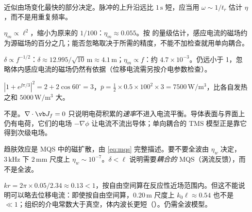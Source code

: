 \begin{answers}
\item 近似由场变化最快的部分决定。脉冲的上升沿远比 $1\,\mathrm s$ 短，应当用 $\omega\sim1/t_r$ 估计 $\eta$，而不是用重复频率。
\item $\eta_m\propto\ell^2$，缩小为原来的 $1/100$：$\eta_m\approx0.055$。按 的量级估计，感应电流的磁场约为源磁场的百分之几；能否忽略取决于所需的精度，不能不加检查就用单向耦合。
\item $\delta\propto f^{-1/2}$：$\delta\approx12.995/\sqrt{10}\,\mathrm m\approx4.1\,\mathrm m$；$\eta_m\propto f$：约 $4.7\times10^{-3}$。仍远小于 1，忽略体内感应电流的磁场仍然有依据（位移电流需另按介电参数检查）。
\item $|1+e^{\jj\pi/3}|^2=2+2\cos60^\circ=3$，$\overline p=\tfrac12\times0.5\times100^2\times3=7500\,\mathrm{W/m^3}$，比各自发热之和 $5000\,\mathrm{W/m^3}$ 大。
\item 不是。$\nabla\cdot\vb J_f=0$ 只说明电荷积累的\emph{速率}不进入电流平衡。导体表面与界面上仍有电荷，它们的电场 $-\nabla\phi$ 让电流不流出导体；单向耦合的 TMS 模型正是靠它得到次级电场。
\item 趋肤效应是 MQS 中的磁扩散，由 \eqref{eq:mqs} 完整描述。要不要全波由 $\eta_w$ 决定，$3\,\mathrm{kHz}$ 下 $2\,\mathrm{mm}$ 尺度上 $\eta_w\sim10^{-7}$。$\delta<\ell$ 说明需要\emph{耦合的} MQS（涡流反馈），而不是全波。
\item $kr=2\pi\times0.05/2.34\approx0.13<1$，按自由空间算在反应性近场范围内。但这不能说明可以略去位移电流：即使按自由空间算，$0.20\,\mathrm m$ 尺度上 $k_0\ell\approx0.54$ 也不是 $\ll1$；组织的介电常数大于真空，体内波长更短（）。仍需全波模型。
\end{answers}
